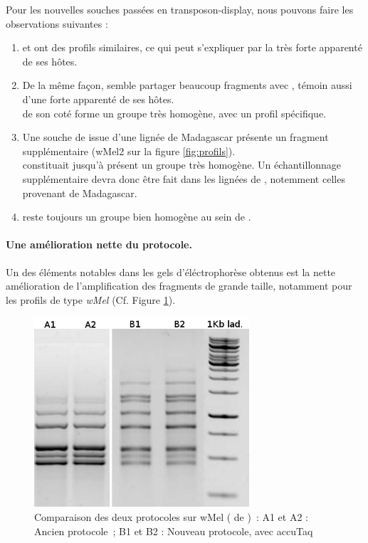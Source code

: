 Pour les nouvelles souches passées en transposon-display, nous pouvons faire les observations suivantes : 
\begin{enumerate}
	\item {} et  ont des profils similaires, ce qui peut s'expliquer par la très forte apparenté de ses hôtes.
	\item De la même façon,  semble partager beaucoup fragments avec , témoin aussi d'une forte apparenté de ses hôtes.\\
	 de son coté forme un groupe très homogène, avec un profil spécifique.
	\item Une souche de  issue d'une lignée de Madagascar présente un fragment supplémentaire (wMel2 sur la figure \ref{fig:profils}).\\
	 constituait jusqu'à présent un groupe très homogène.
	Un échantillonnage supplémentaire devra donc être fait dans les lignées de , notemment celles provenant de Madagascar.
	\item {} reste toujours un groupe bien homogène au sein de .
\end{enumerate}



\paragraph{Une amélioration nette du protocole.} %
\label{par:proto}
Un des éléments notables dans les gels d'éléctrophorèse obtenus est la nette amélioration de l'amplification des fragments de grande taille, notamment pour les profils de type \textit{wMel} (Cf. Figure \ref{fig:wMelcomp}). 

\begin{figure}[h]
	\begin{center}
		\includegraphics[width=80mm]{images/wMel_comp.png}
	\end{center}
	\caption{Comparaison des deux protocoles sur wMel ( de )~:
	A1 et A2 : Ancien protocole\cite{memHH}~;
	B1 et B2 : Nouveau protocole, avec accuTaq}
	\label{fig:wMelcomp}
\end{figure}

